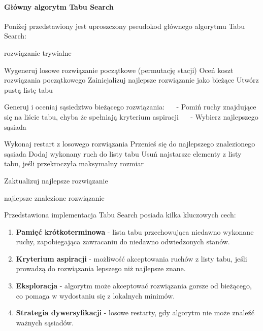\documentclass[12pt,a4paper]{article}
\begin{document}
\paragraph{Główny algorytm Tabu Search}
Poniżej przedstawiony jest uproszczony pseudokod głównego algorytmu Tabu Search:

\begin{algorithmic}[1]
        \Return rozwiązanie trywialne
    \EndIf

    \State Wygeneruj losowe rozwiązanie początkowe (permutację stacji)
    \State Oceń koszt rozwiązania początkowego
    \State Zainicjalizuj najlepsze rozwiązanie jako bieżące
    \State Utwórz pustą listę tabu
    
        \State Generuj i oceniaj sąsiedztwo bieżącego rozwiązania:
        \State $\quad$ - Pomiń ruchy znajdujące się na liście tabu, chyba że spełniają kryterium aspiracji
        \State $\quad$ - Wybierz najlepszego sąsiada

            \State Wykonaj restart z losowego rozwiązania
        \Else
            \State Przenieś się do najlepszego znalezionego sąsiada
            \State Dodaj wykonany ruch do listy tabu
            \State Usuń najstarsze elementy z listy tabu, jeśli przekroczyła maksymalny rozmiar
            
                \State Zaktualizuj najlepsze rozwiązanie
            \EndIf
        \EndIf
    \EndFor
    
    \Return najlepsze znalezione rozwiązanie
\EndProcedure
\end{algorithmic}

Przedstawiona implementacja Tabu Search posiada kilka kluczowych cech:

\begin{enumerate}
    \item \textbf{Pamięć krótkoterminowa} - lista tabu przechowująca niedawno wykonane ruchy, zapobiegająca zawracaniu do niedawno odwiedzonych stanów.
    
    \item \textbf{Kryterium aspiracji} - możliwość akceptowania ruchów z listy tabu, jeśli prowadzą do rozwiązania lepszego niż najlepsze znane.
    
    \item \textbf{Eksploracja} - algorytm może akceptować rozwiązania gorsze od bieżącego, co pomaga w wydostaniu się z lokalnych minimów.
    
    \item \textbf{Strategia dywersyfikacji} - losowe restarty, gdy algorytm nie może znaleźć ważnych sąsiadów.
\end{enumerate}
\end{document}
